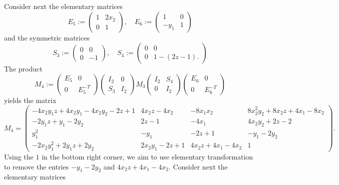 \documentclass[11pt,leqno]{article}
\renewcommand{\1}{{\rm 1\hspace*{-0.4ex}%
\rule{0.1ex}{1.52ex}\hspace*{0.2ex}}}
\newcommand{\<}[1]{{\langle}#1 {\rangle}}
\theoremstyle{plain}
\theoremstyle{definition}
\theoremstyle{remark}
\numberwithin{equation}{section}
\begin{document}
Consider next the elementary matrices 
\begin{equation*}
    E_5 := \begin{pmatrix}
        1 & 2x_2 \\0 & 1 
    \end{pmatrix}, \quad E_6 := \begin{pmatrix} 1 & 0 \\ -y_1 & 1
    \end{pmatrix} 
\end{equation*}
and the symmetric matrices 
\begin{equation*}
    S_3 := \begin{pmatrix}
        0 & 0 \\ 0 & -1 
    \end{pmatrix}, \quad S_4 := \begin{pmatrix}
        0 & 0 \\ 0 & 1 - (2z-1).
    \end{pmatrix}
\end{equation*}
The product
\begin{equation*} M_4 := 
\begin{pmatrix} 
        E_5 & 0 \\ 0 & E_5^{-T}
    \end{pmatrix}
    \begin{pmatrix}
        I_2 & 0 \\ S_3 & I_2 
    \end{pmatrix} M_3 \begin{pmatrix}
        I_2 & S_4 \\ 0 & I_2 
    \end{pmatrix} \begin{pmatrix}
        E_6 & 0 \\ 0 & E_6^{-T}
    \end{pmatrix} 
\end{equation*}
yields the matrix 
\begin{equation*}
    M_4 = \begin{pmatrix}
       -4x_2y_1z+4x_2y_1-4x_2y_2-2z+1& 4x_2z-4x_2& -8x_1x_2& 8x_2^2y_2+8x_2z+4x_1-8x_2\\ -2y_1z+y_1-2y_2& 2z-1& -4x_1& 4x_2y_2+2z-2\\ y_1^2& -y_1& -2z+1& -y_1-2y_2\\-2x_2y_1^2+2y_1z+2y_2& 2x_2y_1-2z+1& 4x_2z+4x_1-4x_2& 1
    \end{pmatrix}.
\end{equation*}
Using the $1$ in the bottom right corner, we aim to use elementary transformation to remove the entries $-y_1 - 2y_2$ and $4x_2z + 4x_1 -4x_2$. Consider next the elementary matrices 
\end{document}
